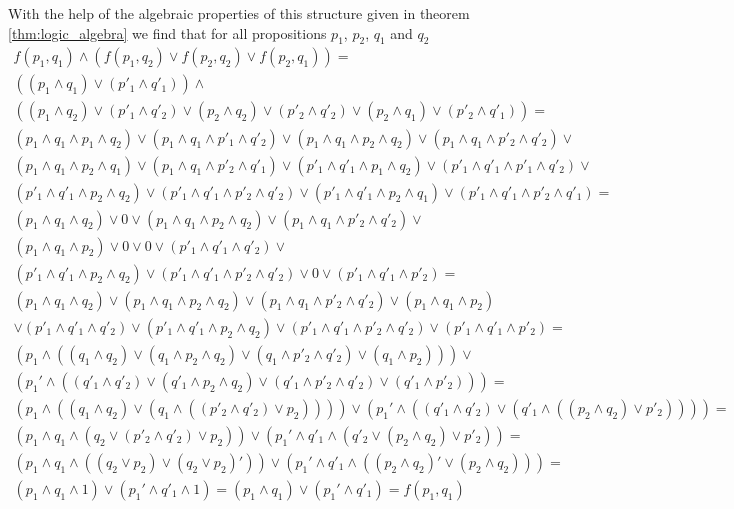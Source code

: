 With the help of the algebraic properties of this structure given in theorem \ref{thm:logic_algebra} we find that for all propositions $p_1$, $p_2$, $q_1$ and $q_2$
\begin{multline}
f(p_1,q_1)\wedge (f(p_1,q_2)\vee f(p_2,q_2)\vee f(p_2,q_1)) = \\ ((p_1\wedge q_1)\vee (p'_1 \wedge q'_1))\wedge \\ ((p_1\wedge q_2)\vee (p'_1 \wedge q'_2)\vee(p_2\wedge q_2)\vee (p'_2 \wedge q'_2)\vee(p_2\wedge q_1)\vee (p'_2 \wedge q'_1)) = \\ (p_1\wedge q_1\wedge  p_1\wedge q_2)\vee (p_1\wedge q_1\wedge  p'_1 \wedge q'_2)\vee(p_1\wedge q_1\wedge  p_2\wedge q_2)\vee (p_1\wedge q_1\wedge  p'_2 \wedge q'_2)\vee \\(p_1\wedge q_1\wedge  p_2\wedge q_1)\vee (p_1\wedge q_1\wedge  p'_2 \wedge q'_1) \vee (p'_1\wedge q'_1\wedge  p_1\wedge q_2)\vee (p'_1\wedge q'_1\wedge  p'_1 \wedge q'_2)\vee \\ (p'_1\wedge q'_1\wedge  p_2\wedge q_2)\vee (p'_1\wedge q'_1\wedge  p'_2 \wedge q'_2)\vee(p'_1\wedge q'_1\wedge  p_2\wedge q_1)\vee (p'_1\wedge q'_1\wedge  p'_2 \wedge q'_1)= \\ (p_1\wedge q_1 \wedge q_2)\vee 0\vee(p_1\wedge q_1\wedge  p_2\wedge q_2)\vee (p_1\wedge q_1\wedge  p'_2 \wedge q'_2)\vee \\(p_1\wedge q_1\wedge  p_2)\vee 0 \vee 0\vee (p'_1\wedge q'_1 \wedge q'_2)\vee \\ (p'_1\wedge q'_1\wedge  p_2\wedge q_2)\vee (p'_1\wedge q'_1\wedge  p'_2 \wedge q'_2)\vee 0\vee (p'_1\wedge q'_1\wedge  p'_2 )= \\ (p_1\wedge q_1 \wedge q_2)\vee(p_1\wedge q_1\wedge  p_2\wedge q_2)\vee (p_1\wedge q_1\wedge  p'_2 \wedge q'_2)\vee (p_1\wedge q_1\wedge  p_2) \\ \vee (p'_1\wedge q'_1 \wedge q'_2)\vee (p'_1\wedge q'_1\wedge  p_2\wedge q_2)\vee (p'_1\wedge q'_1\wedge  p'_2 \wedge q'_2)\vee (p'_1\wedge q'_1\wedge  p'_2 )= \\(p_1\wedge((q_1 \wedge q_2)\vee( q_1\wedge  p_2\wedge q_2)\vee (q_1\wedge  p'_2 \wedge q'_2)\vee ( q_1\wedge  p_2)))\vee \\ (p_1'\wedge((q'_1 \wedge q'_2)\vee (q'_1\wedge  p_2\wedge q_2)\vee (q'_1\wedge  p'_2 \wedge q'_2)\vee (q'_1\wedge  p'_2 )))= \\ (p_1\wedge((q_1 \wedge q_2)\vee (q_1\wedge(( p'_2 \wedge q'_2)\vee p_2))))\vee  (p_1'\wedge((q'_1 \wedge q'_2)\vee (q'_1\wedge ((p_2\wedge q_2)\vee p'_2) )))= \\ (p_1\wedge q_1\wedge (q_2\vee ( p'_2 \wedge q'_2)\vee p_2))\vee (p_1'\wedge q'_1 \wedge (q'_2 \vee (p_2\wedge q_2) \vee p'_2) )=  \\ (p_1\wedge q_1\wedge ((q_2 \vee p_2) \vee (q_2 \vee p_2)'))\vee (p_1'\wedge q'_1 \wedge ((p_2\wedge q_2)'\vee (p_2\wedge q_2)) )= \\ (p_1\wedge q_1\wedge 1)\vee (p_1'\wedge q'_1 \wedge 1)= (p_1\wedge q_1)\vee (p_1'\wedge q'_1)=f(p_1,q_1)
\end{multline}
